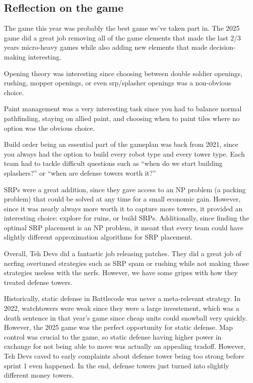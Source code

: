 \subsection{Reflection on the game}

The game this year was probably the best game we've taken part in. The 2025 game did a great job removing all of the game elements that made the last 2/3 years micro-heavy games while also adding new elements that made decision-making interesting. 

\medskip

Opening theory was interesting since choosing between double soldier openings, rushing, mopper openings, or even srp/splasher openings was a non-obvious choice. 

\medskip

Paint management was a very interesting task since you had to balance normal pathfinding, staying on allied paint, and choosing when to paint tiles where no option was the obvious choice.

\medskip

Build order being an essential part of the gameplan was back from 2021, since you always had the option to build every robot type and every tower type. Each team had to tackle difficult questions such as ``when do we start building splashers?'' or ``when are defense towers worth it?''

\medskip

SRPs were a great addition, since they gave access to an NP problem (a packing problem) that could be solved at any time for a small economic gain. However, since it was nearly always more worth it to capture more towers, it provided an interesting choice: explore for ruins, or build SRPs. Additionally, since finding the optimal SRP placement is an NP problem, it meant that every team could have slightly different approximation algorithms for SRP placement.

\medskip

Overall, Teh Devs did a fantastic job releasing patches. They did a great job of nerfing overtuned strategies such as SRP spam or rushing while not making those strategies useless with the nerfs. However, we have some gripes with how they treated defense towers. 

\medskip

Historically, static defense in Battlecode was never a meta-relevant strategy. In 2022, watchtowers were weak since they were a large investement, which was a death sentence in that year's game since cheap units could snowball very quickly. However, the 2025 game was the perfect opportunity for static defense. Map control was crucial to the game, so static defense having higher power in exchange for not being able to move was actually an appealing tradoff. However, Teh Devs caved to early complaints about defense tower being too strong before sprint 1 even happened. In the end, defense towers just turned into slightly different money towers.

